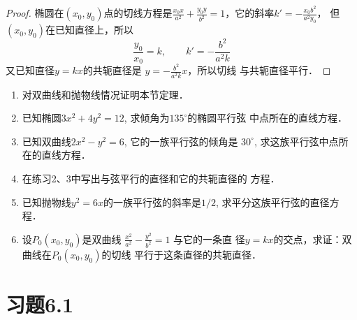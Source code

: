 \begin{proof}
    椭圆在$(x_0,y_0)$点的切线方程是$\frac{x_0x}{a^2}+\frac{y_0y}{b^2}=1$，它的斜率$k'=-\frac{x_0b^2}{a^2y_0}$，
    但$(x_0,y_0)$在已知直径上，所以
\[\frac{y_0}{x_0}=k,\qquad k'=-\frac{b^2}{a^2k}\]
又已知直径$y=kx$的共轭直径是
$y=-\frac{b^2}{a^2k}x$，所以切线
与共轭直径平行．
\end{proof}


\begin{ex}
\begin{enumerate}
    \item 对双曲线和抛物线情况证明本节定理．
    \item 已知椭圆$3x^2+4y^2=12$, 求倾角为$135^{\circ}$的椭圆平行弦
    中点所在的直线方程．
    \item 已知双曲线$2x^2-y^2=6$, 它的一族平行弦的倾角是
    $30^{\circ}$, 求这族平行弦中点所在的直线方程．
    \item 在练习2、3中写出与弦平行的直径和它的共轭直径的
    方程．
    \item 已知抛物线$y^2=6x$的一族平行弦的斜率是$1/2$, 
    求平分这族平行弦的直径方程．
    \item 设$P_0(x_0,y_0)$是双曲线
    $\frac{x^2}{a^2}-\frac{y^2}{b^2}=1$
    与它的一条直
    径$y=kx$的交点，求证：双曲线在$P_0(x_0,y_0)$的切线
    平行于这条直径的共轭直径．
\end{enumerate}
\end{ex}

\section*{习题6.1}


